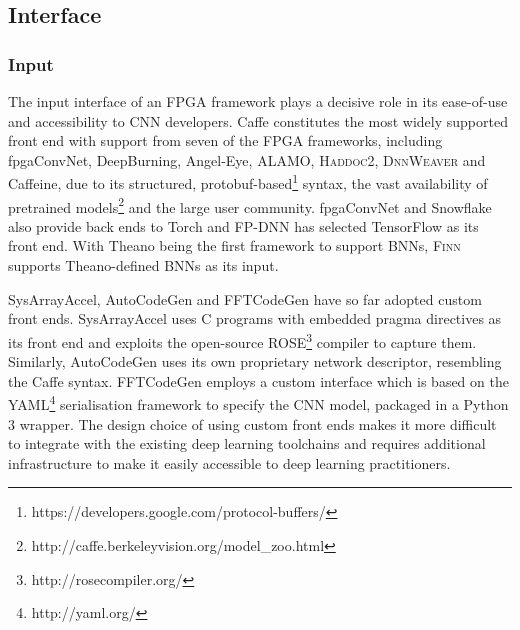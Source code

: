 \documentclass[format=acmsmall, review=false, screen=true]{acmart}
\begin{document}
\subsection{Interface}\label{sec4}
\subsubsection{Input}  \label{sec:inter_IN}
The input interface of an FPGA framework plays a decisive role in its ease-of-use and accessibility to CNN developers. Caffe constitutes the most widely supported front end with support from {\color{black}seven} of the FPGA frameworks, including fpgaConvNet, DeepBurning, Angel-Eye, ALAMO, {\color{black}\textsc{Haddoc2}}, \textsc{DnnWeaver} and Caffeine, due to its structured, protobuf-based\footnote{https://developers.google.com/protocol-buffers/} syntax, the vast availability of pretrained models\footnote{http://caffe.berkeleyvision.org/model\_zoo.html} and the large user community. %
fpgaConvNet {\color{black}and Snowflake} also provide back ends to Torch and FP-DNN has selected TensorFlow as its front end. %
With Theano being the first framework to support BNNs, \textsc{Finn} supports Theano-defined BNNs as its input.

SysArrayAccel, {\color{black}AutoCodeGen and FFTCodeGen} have so far adopted custom front ends. SysArrayAccel uses C programs with embedded pragma directives as its front end and exploits the open-source ROSE\footnote{http://rosecompiler.org/} compiler to capture them. {\color{black}Similarly, AutoCodeGen uses its own proprietary network descriptor, resembling the Caffe syntax. FFTCodeGen employs a custom interface which is based on the YAML\footnote{http://yaml.org/} serialisation framework to specify the CNN model, packaged in a Python 3 wrapper.} The design choice of using custom front ends makes it more difficult to integrate with the existing deep learning toolchains and requires additional infrastructure to make it easily accessible to deep learning practitioners.


\end{document}
